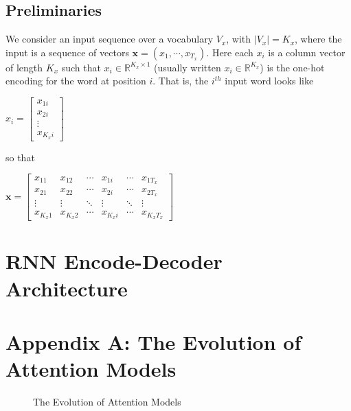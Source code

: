 \documentclass[11pt, oneside]{article}
\theoremstyle{definition}
\begin{document}
\subsection{Preliminaries}
\noindent
We consider an input sequence over a vocabulary $V_x$, with
$|V_x| = K_x$, where the input is a sequence of vectors
$\mathbf{x} = (x_1, \cdots, x_{T_x})$. Here each $x_i$ is a
column vector of length $K_x$ such that $x_i \in
\mathbb{R}^{K_{x} \times 1}$ (usually written $x_i \in
\mathbb{R}^{K_x}$) is the one-hot encoding for the word at
position $i$. That is, the $i^{th}$ input word looks like

\bigskip
$x_i = \begin{bmatrix}
x_{1i} \\
x_{2i} \\
\vdots \\
x_{K_{x}i} 
\end{bmatrix}$

\bigskip
\noindent
so that

\bigskip
$\mathbf{x} = \begin{bmatrix}
x_{11} & x_{12} & \cdots & x_{1i} & \cdots & x_{1T_x} \\
x_{21} & x_{22} & \cdots & x_{2i} & \cdots & x_{2T_x}\\
\vdots & \vdots & \ddots & \vdots & \ddots  & \vdots\\
x_{K_{x}1} & x_{K_{x}2} & \cdots & x_{K_{x}i} & \cdots &  x_{K_{x}T_x}
\end{bmatrix}
$

\section{RNN Encode-Decoder Architecture} 
\label{sec:rnn}

\section{Appendix A: The Evolution of Attention Models}
\label{sec:appendix_a}

\begin{figure}[H]
\caption{The Evolution of Attention Models}
\label{fig:attention_evolution}
\end{figure}
%
%
%
\end{document}

